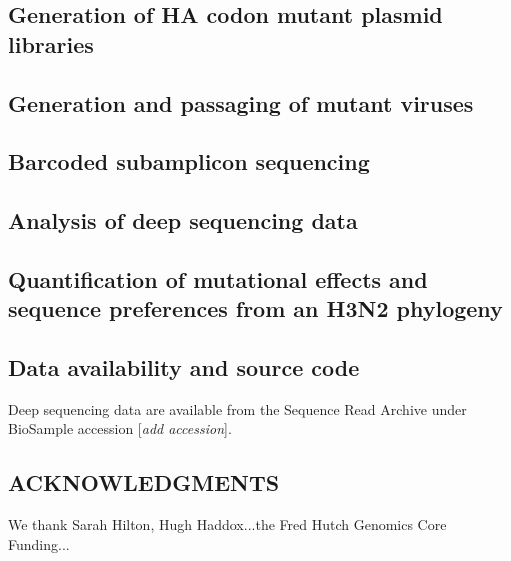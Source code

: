 \documentclass[11pt]{article}
\newcommand{\comment}[1]{{\color{red}[\textsl{#1}]}}
\begin{document}
\subsection*{Generation of HA codon mutant plasmid libraries}

\subsection*{Generation and passaging of mutant viruses}

\subsection*{Barcoded subamplicon sequencing}

\subsection*{Analysis of deep sequencing data}

\subsection*{Quantification of mutational effects and sequence preferences from an H3N2 phylogeny}

\subsection*{Data availability and source code}
Deep sequencing data are available from the Sequence Read Archive under BioSample accession \comment{add accession}.


\subsection*{ACKNOWLEDGMENTS}
We thank Sarah Hilton, Hugh Haddox...the Fred Hutch Genomics Core
Funding...
\end{document}
